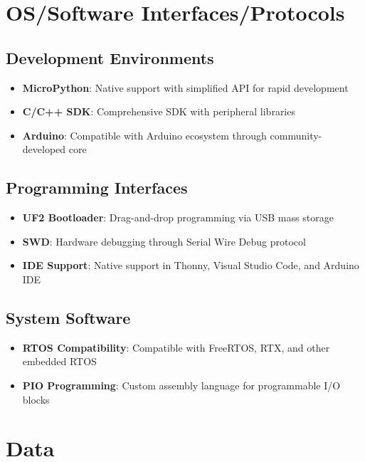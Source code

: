 \section{OS/Software Interfaces/Protocols}

\subsection{Development Environments}
\begin{itemize}
    \item \textbf{MicroPython}: Native support with simplified API for rapid development \cite{Schneider:2023}
    \item \textbf{C/C++ SDK}: Comprehensive SDK with peripheral libraries \cite{Schneider:2023}
    \item \textbf{Arduino}: Compatible with Arduino ecosystem through community-developed core \cite{Schneider:2023}
\end{itemize}

\subsection{Programming Interfaces}
\begin{itemize}
    \item \textbf{UF2 Bootloader}: Drag-and-drop programming via USB mass storage \cite{Schneider:2023}
    \item \textbf{SWD}: Hardware debugging through Serial Wire Debug protocol \cite{RaspberryPiRP2040:2024}
    \item \textbf{IDE Support}: Native support in Thonny, Visual Studio Code, and Arduino IDE \cite{Schneider:2023}
\end{itemize}

\subsection{System Software}
\begin{itemize}
    \item \textbf{RTOS Compatibility}: Compatible with FreeRTOS, RTX, and other embedded RTOS \cite{RaspberryPiRP2040:2024}
    \item \textbf{PIO Programming}: Custom assembly language for programmable I/O blocks \cite{RaspberryPiRP2040:2024}
\end{itemize}

\section{Data}

